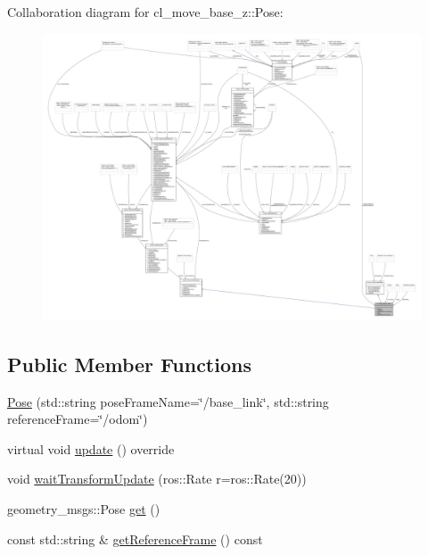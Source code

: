 Collaboration diagram for cl\+\_\+move\+\_\+base\+\_\+z\+:\+:Pose\+:
\nopagebreak
\begin{figure}[H]
\begin{center}
\leavevmode
\includegraphics[width=350pt]{classcl__move__base__z_1_1Pose__coll__graph}
\end{center}
\end{figure}
\subsection*{Public Member Functions}
\begin{DoxyCompactItemize}
\item 
\hyperlink{classcl__move__base__z_1_1Pose_ac6fa1844b8ec8846e8ca5ffe67e68aab}{Pose} (std\+::string pose\+Frame\+Name=\char`\"{}/base\+\_\+link\char`\"{}, std\+::string reference\+Frame=\char`\"{}/odom\char`\"{})
\item 
virtual void \hyperlink{classcl__move__base__z_1_1Pose_abf99d1127cf51a93f97ada2031196114}{update} () override
\item 
void \hyperlink{classcl__move__base__z_1_1Pose_a5f8576c3dacfb2f2e7f9df5105c480ea}{wait\+Transform\+Update} (ros\+::\+Rate r=ros\+::\+Rate(20))
\item 
geometry\+\_\+msgs\+::\+Pose \hyperlink{classcl__move__base__z_1_1Pose_a6e3d311de54516653d773d9b7eb1d85d}{get} ()
\item 
const std\+::string \& \hyperlink{classcl__move__base__z_1_1Pose_aaef18a35d7698fcbf6712149eead8e8d}{get\+Reference\+Frame} () const 
\end{DoxyCompactItemize}
